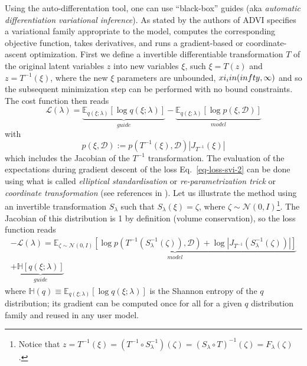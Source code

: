 \documentclass[twocolumn,twocolappendix,nofootinbib,iop]{openjournal}
\newcommand{\numpyro}{\texttt{NumPyro}}
\newcommand{\bydef}{:=}
\begin{document}
Using the auto-differentation tool, one can use ``black-box'' guides (aka \textit{automatic differentiation variational inference}). As stated by the authors of \citep{10.5555/3122009.3122023} ADVI specifies a variational family appropriate to the model, computes the corresponding objective
function, takes derivatives, and runs a gradient-based or coordinate-ascent optimization. First we define a invertible differentiable transformation $T$ of the original latent variables $z$ into new variables $\xi$, such $\xi=T(z)$ and $z=T^{-1}(\xi)$, where the new $\xi$ parameters are unbounded, $xi_i in (\-infty, \infty)$ and so the subsequent minimization step can be performed with no bound constraints. 
The cost function then reads
\begin{equation}
\mathcal{L}(\lambda) = \underbrace{\mathbb{E}_{q(\xi;\lambda)}\left[ \log q(\xi;\lambda)\right]}_{guide} - \underbrace{\mathbb{E}_{q(\xi;\lambda)}\left[ \log p(\xi,\mathcal{D}) \right]}_{model}
\label{eq-loss-svi-2}
\end{equation}
with
\begin{equation}
p(\xi,\mathcal{D}) \bydef p(T^{-1}(\xi),\mathcal{D}) |J_{T^{-1}}(\xi)|
\end{equation}
which includes the Jacobian of the $T^{-1}$ transformation.
The evaluation of the expectations during gradient descent of the loss Eq.~\ref{eq-loss-svi-2} can be done using what is called \textit{elliptical standardisation} or \textit{re-parametrization trick} or \textit{coordinate transformation} (see references in \citealt{10.5555/2969239.2969303}).  Let us illustrate the method using an invertible transformation  $S_\lambda$ such that $S_\lambda(\xi)=\zeta$, where $\zeta\sim \mathcal{N}(0,I)$\footnote{Notice that $z=T^{-1}(\xi)=(T^{-1} \circ S_\lambda^{-1})(\zeta)=(S_\lambda \circ T)^{-1}(\zeta)=F_\lambda(\zeta)$.}. The Jacobian of this distribution is 1 by definition (volume conservation), so the loss function reads
\begin{multline}
-\mathcal{L}(\lambda) = \underbrace{\mathbb{E}_{\zeta\sim \mathcal{N}(0,I)}\left[ \log p(T^{-1}(S_\lambda^{-1}(\zeta)),\mathcal{D}) + \log |J_{T^{-1}}(S_\lambda^{-1}(\zeta))| \right]}_{model} \\ + \underbrace{\mathbb{H}[q(\xi;\lambda)]}_{guide}
\label{eq-loss-svi-3}
\end{multline}
where $\mathbb{H}(q)\equiv \mathbb{E}_{q(\xi;\lambda)}\left[ \log q(\xi;\lambda)\right]$ is the Shannon entropy of the $q$ distribution; its gradient can be computed once for all for a given $q$ distribution family and reused in any user model.  
\end{document}
